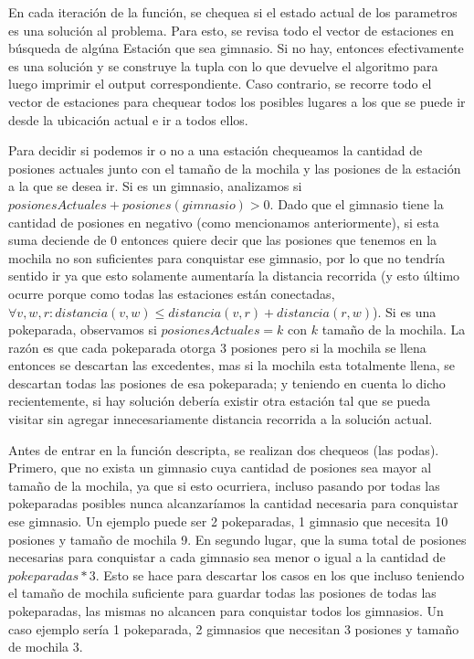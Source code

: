            En cada iteración de la función, se chequea si el estado actual de los parametros es una solución al problema. Para esto, se revisa todo el vector de estaciones en búsqueda de algúna Estación que sea gimnasio. Si no hay, entonces efectivamente es una solución y se construye la tupla con lo que devuelve el algoritmo para luego imprimir el output correspondiente. Caso contrario, se recorre todo el vector de estaciones para chequear todos los posibles lugares a los que se puede ir desde la ubicación actual e ir a todos ellos.

            Para decidir si podemos ir o no a una estación chequeamos la cantidad de posiones actuales junto con el tamaño de la mochila y las posiones de la estación a la que se desea ir. Si es un gimnasio, analizamos si $posionesActuales + posiones(gimnasio) > 0$. Dado que el gimnasio tiene la cantidad de posiones en negativo (como mencionamos anteriormente), si esta suma deciende de 0 entonces quiere decir que las posiones que tenemos en la mochila no son suficientes para conquistar ese gimnasio, por lo que no tendría sentido ir ya que esto solamente aumentaría la distancia recorrida (y esto último ocurre porque como todas las estaciones están conectadas,  $\forall v,w,r : distancia(v,w) \leq distancia(v,r) + distancia(r,w)$). Si es una pokeparada, observamos si $posionesActuales = k$ con $k$ tamaño de la mochila. La razón es que cada pokeparada otorga 3 posiones pero si la mochila se llena entonces se descartan las excedentes, mas si la mochila esta totalmente llena, se descartan todas las posiones de esa pokeparada; y teniendo en cuenta lo dicho recientemente, si hay solución debería existir otra estación tal que se pueda visitar sin agregar innecesariamente distancia recorrida a la solución actual.

            Antes de entrar en la función descripta, se realizan dos chequeos (las podas). Primero, que no exista un gimnasio cuya cantidad de posiones sea mayor al tamaño de la mochila, ya que si esto ocurriera, incluso pasando por todas las pokeparadas posibles nunca alcanzaríamos la cantidad necesaria para conquistar ese gimnasio. Un ejemplo puede ser 2 pokeparadas, 1 gimnasio que necesita 10 posiones y tamaño de mochila 9. En segundo lugar, que la suma total de posiones necesarias para conquistar a cada gimnasio sea menor o igual a la cantidad de $pokeparadas*3$. Esto se hace para descartar los casos en los que incluso teniendo el tamaño de mochila suficiente para guardar todas las posiones de todas las pokeparadas, las mismas no alcancen para conquistar todos los gimnasios. Un caso ejemplo sería 1 pokeparada, 2 gimnasios que necesitan 3 posiones y tamaño de mochila 3.


